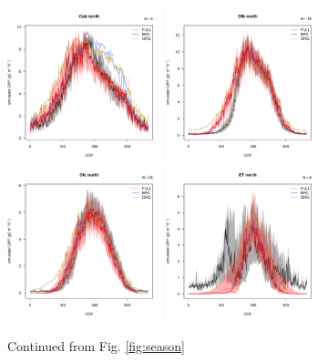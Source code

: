 \documentclass{myreport}
\begin{document}
 \begin{figure}[!ht]
    \centering
\includegraphics[width=0.4\textwidth]{fig/meandoy_byzone_Csbnorth_all.pdf}
\includegraphics[width=0.4\textwidth]{fig/meandoy_byzone_Dfbnorth_all.pdf}\\
\includegraphics[width=0.4\textwidth]{fig/meandoy_byzone_Dfcnorth_all.pdf}
\includegraphics[width=0.4\textwidth]{fig/meandoy_byzone_ETnorth_all.pdf}
    \caption{Continued from Fig. \ref{fig:season}}
    \label{fig:season2}
\end{figure}
\end{document}
